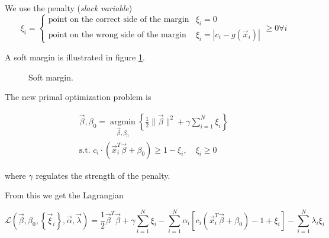 We use the penalty (\textit{slack variable})
\begin{equation}
    \xi_i = \begin{cases}
        \text{point on the correct side of the margin} & \xi_i = 0 \\
        \text{point on the wrong side of the margin} & \xi_i = |c_i - g(\vec{x}_i)|
    \end{cases} \geq 0 \forall i
\end{equation}


A soft margin is illustrated in figure \ref{fig:soft_margin}.

\begin{figure}[!htb]
    \centering
    
    \caption{Soft margin.}
    \label{fig:soft_margin}
\end{figure}

The new primal optimization problem is

\begin{equation}
    \begin{gathered}
        \vec{\beta}, \beta_0=\underset{\vec{\beta}, \beta_0}{\operatorname{argmin}}\left\{\frac{1}{2}\|\vec{\beta}\|^2 + \gamma \sum_{i=1}^N \xi_i \right\} \\
        \text{s.t. } c_i \cdot\left(\vec{x}_i^T \vec{\beta}+\beta_0\right) \geq 1-\xi_i, \quad \xi_i \geq 0
    \end{gathered}
\end{equation}

where $\gamma$ regulates the strength of the penalty.

From this we get the Lagrangian

\begin{equation}
    \mathcal{L}\left(\vec{\beta}, \beta_0, \left\{ \vec{\xi}_i \right\}, \vec{\alpha}, \vec{\lambda}\right) = \frac{1}{2} \vec{\beta}^T \vec{\beta} + \gamma \sum_{i=1}^N \xi_i - \sum_{i=1}^N \alpha_i \left[ c_i \left( \vec{x}_i^T \vec{\beta} + \beta_0 \right) - 1 + \xi_i \right] - \sum_{i=1}^N \lambda_i \xi_i
\end{equation}

